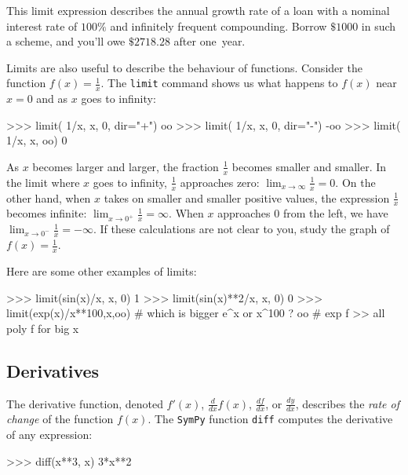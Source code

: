 \noindent
This limit expression describes the annual growth rate of a loan
with a nominal interest rate of $100\%$ and infinitely frequent compounding.							
Borrow $\$1000$ in such a scheme,
and you'll owe $\$2718.28$ after one~year.

Limits are also useful to describe the behaviour of functions.
Consider the function $f(x)=\frac{1}{x}$.
The \texttt{limit} command shows us what happens to $f(x)$ near $x=0$ and as $x$ goes to infinity:

\small
\begin{verbatimtab}
>>> limit( 1/x, x, 0, dir="+")
oo
>>> limit( 1/x, x, 0, dir="-")
-oo
>>> limit( 1/x, x, oo)
0
\end{verbatimtab}
\normalsize

\noindent
As $x$ becomes larger and larger, the fraction $\frac{1}{x}$ becomes smaller and smaller.
In the limit where $x$ goes to infinity, $\frac{1}{x}$ approaches zero: $\lim_{x\to \infty} \frac{1}{x} = 0$. 
On the other hand, when $x$ takes on smaller and smaller positive values,
the expression $\frac{1}{x}$ becomes infinite: $\lim_{x \to 0^+} \frac{1}{x} = \infty$.
When $x$ approaches $0$ from the left, we have $\lim_{x \to 0^-} \frac{1}{x} = -\infty$.
If these calculations are not clear to you,
study the graph of $f(x)=\frac{1}{x}$.


Here are some other examples of limits:

\small
\begin{verbatimtab}
>>> limit(sin(x)/x, x, 0)
1
>>> limit(sin(x)**2/x, x, 0)
0
>>> limit(exp(x)/x**100,x,oo) # which is bigger e^x or x^100 ?
oo                            # exp f >> all poly f for big x  
\end{verbatimtab}
\normalsize


\subsection{Derivatives}
\label{calculus:derivatives}
The derivative function, denoted $f'(x)$, $\frac{d}{dx}f(x)$, $\frac{df}{dx}$, or $\frac{dy}{dx}$, 								
describes the \emph{rate of change} of the function $f(x)$.
The \texttt{SymPy} function \texttt{diff} computes the derivative of any expression:



\small
\begin{verbatimtab}
>>> diff(x**3, x)
3*x**2
\end{verbatimtab}
\normalsize

